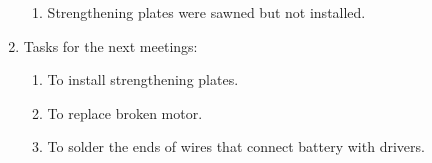 \begin{enumerate}
\begin{enumerate}
		\item Strengthening plates were sawned but not installed.
	\end{enumerate}
	
	\item Tasks for the next meetings:
	\begin{enumerate}
		\item To install strengthening plates.
		
		\item To replace broken motor.
		
		\item To solder the ends of wires that connect battery with drivers.		
	\end{enumerate}
\end{enumerate}
\fillpage
